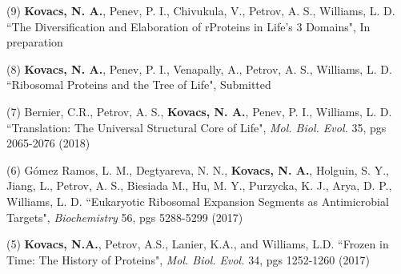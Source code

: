 

\begin{cvpublications}


\cvpublication
{(9) {\bf Kovacs, N. A.}, Penev, P. I., Chivukula, V., Petrov, A. S., Williams, L. D. ``The Diversification and Elaboration of rProteins in Life’s 3 Domains", In preparation}
\vspace{-4.0mm}


{(8) {\bf Kovacs, N. A.}, Penev, P. I., Venapally, A., Petrov, A. S., Williams, L. D. ``Ribosomal Proteins and the Tree of Life", Submitted}


{(7) Bernier, C.R., Petrov, A. S., {\bf Kovacs, N. A.},  Penev, P. I., Williams, L. D. ``Translation: The Universal Structural Core of Life", \textit{Mol. Biol. Evol.} 35, pgs 2065-2076 (2018)}


{(6) G{\'o}mez Ramos, L. M., Degtyareva, N. N., {\bf Kovacs, N. A.}, Holguin, S. Y., Jiang, L., Petrov, A. S., Biesiada M., Hu, M. Y., Purzycka, K. J., Arya, D. P., Williams, L. D. ``Eukaryotic Ribosomal Expansion Segments as Antimicrobial Targets", \textit{Biochemistry} 56, pgs 5288-5299 (2017)}


\cvpublication
{(5) {\bf Kovacs, N.A.}, Petrov, A.S., Lanier, K.A., and Williams, L.D. ``Frozen in Time: The History of Proteins", \textit{Mol. Biol. Evol.} 34, pgs 1252-1260 (2017)}
\vspace{-4.0mm}



\end{cvpublications}
